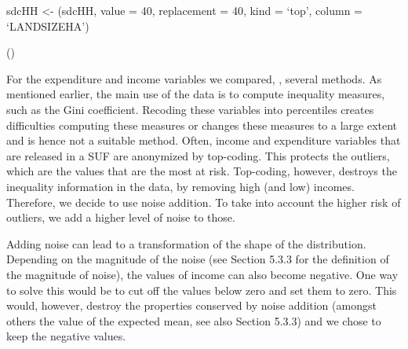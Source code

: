 \documentclass[letterpaper,10pt,english]{sphinxmanual}
\begin{document}
\begin{DUlineblock}{0em}
\item[] 
\item[] sdcHH \textless{}- (sdcHH, value = 40, replacement = 40, kind
= ‘top’, column = ‘LANDSIZEHA’)
\end{DUlineblock}

\begin{DUlineblock}{0em}
\item[] 
\item[] ()
\end{DUlineblock}

\begin{DUlineblock}{0em}
\item[] 
\item[] 
\end{DUlineblock}

For the expenditure and income variables we compared, , several methods. As mentioned earlier, the
main use of the data is to compute inequality measures, such as the Gini
coefficient. Recoding these variables into percentiles creates
difficulties computing these measures or changes these measures to a
large extent and is hence not a suitable method. Often, income and
expenditure variables that are released in a SUF are anonymized by
top-coding. This protects the outliers, which are the values that are
the most at risk. Top-coding, however, destroys the inequality
information in the data, by removing high (and low) incomes. Therefore,
we decide to use noise addition. To take into account the higher risk of
outliers, we add a higher level of noise to those.

Adding noise can lead to a transformation of the shape of the
distribution. Depending on the magnitude of the noise (see Section 5.3.3
for the definition of the magnitude of noise), the values of income can
also become negative. One way to solve this would be to cut off the
values below zero and set them to zero. This would, however, destroy the
properties conserved by noise addition (amongst others the value of the
expected mean, see also Section 5.3.3) and we chose to keep the negative
values.
\end{document}
